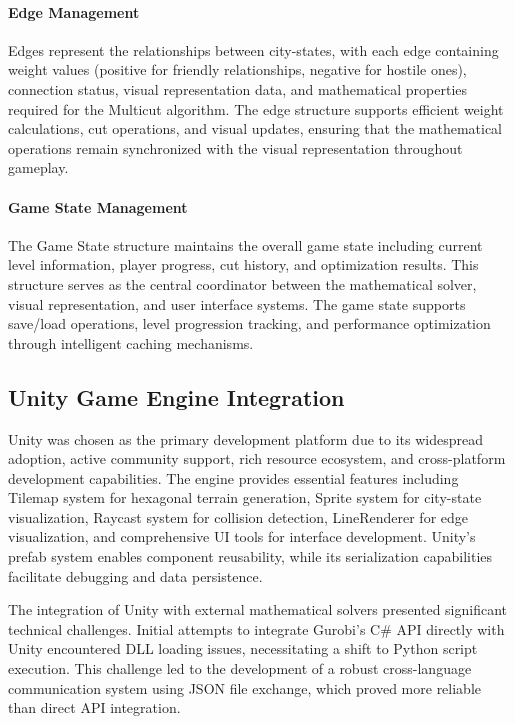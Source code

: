 \documentclass[english]{tudscrreprt}
\begin{document}
\paragraph{Edge Management}
Edges represent the relationships between city-states, with each edge containing weight values (positive for friendly relationships, negative for hostile ones), connection status, visual representation data, and mathematical properties required for the Multicut algorithm. The edge structure supports efficient weight calculations, cut operations, and visual updates, ensuring that the mathematical operations remain synchronized with the visual representation throughout gameplay.

\paragraph{Game State Management}
The Game State structure maintains the overall game state including current level information, player progress, cut history, and optimization results. This structure serves as the central coordinator between the mathematical solver, visual representation, and user interface systems. The game state supports save/load operations, level progression tracking, and performance optimization through intelligent caching mechanisms.

\subsection{Unity Game Engine Integration}
Unity was chosen as the primary development platform due to its widespread adoption, active community support, rich resource ecosystem, and cross-platform development capabilities. The engine provides essential features including Tilemap system for hexagonal terrain generation, Sprite system for city-state visualization, Raycast system for collision detection, LineRenderer for edge visualization, and comprehensive UI tools for interface development. Unity's prefab system enables component reusability, while its serialization capabilities facilitate debugging and data persistence.

The integration of Unity with external mathematical solvers presented significant technical challenges. Initial attempts to integrate Gurobi's C\# API directly with Unity encountered DLL loading issues, necessitating a shift to Python script execution. This challenge led to the development of a robust cross-language communication system using JSON file exchange, which proved more reliable than direct API integration.
\end{document}
